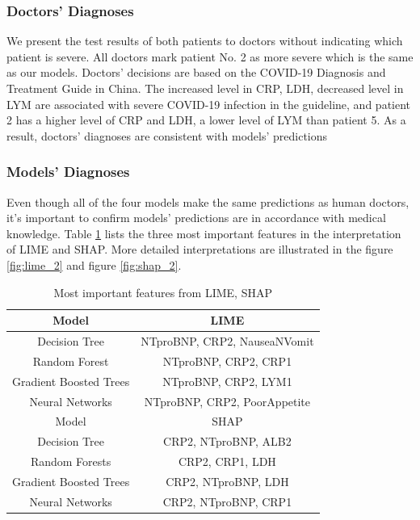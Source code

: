 \subsubsection{Doctors' Diagnoses}

We present the test results of both patients to doctors without indicating which patient is severe. All doctors mark patient No. 2 as more severe which is the same as our models. Doctors' decisions are based on the COVID-19 Diagnosis and Treatment Guide in China. The increased level in CRP, LDH, decreased level in LYM are associated with severe COVID-19 infection in the guideline, and patient 2 has a higher level of CRP and LDH, a lower level of LYM than patient 5. As a result, doctors' diagnoses are consistent with models' predictions

\subsubsection{Models' Diagnoses}

Even though all of the four models make the same predictions as human doctors, it's important to confirm models' predictions are in accordance with medical knowledge. Table \ref{tab:important_feature_patient} lists the three most important features in the interpretation of LIME and SHAP. More detailed interpretations are illustrated in the figure \ref{fig:lime_2} and figure \ref{fig:shap_2}.

\begin{table}[H]
\centering
\begin{tabular}{@{}cc@{}}
\toprule
Model                   & LIME                          \\  
\toprule
Decision Tree           & NTproBNP, CRP2, NauseaNVomit  \\
Random Forest           & NTproBNP, CRP2, CRP1          \\  
Gradient Boosted Trees  & NTproBNP, CRP2, LYM1          \\  
Neural Networks         & NTproBNP, CRP2, PoorAppetite  \\
\toprule
Model                   & SHAP  \\ 
\toprule
Decision Tree           & CRP2, NTproBNP, ALB2 \\
Random Forests          & CRP2, CRP1, LDH      \\
Gradient Boosted Trees  & CRP2, NTproBNP, LDH  \\
Neural Networks         & CRP2, NTproBNP, CRP1 \\  
\bottomrule
\end{tabular}
\caption{Most important features from LIME, SHAP}
\label{tab:important_feature_patient}
\end{table}


